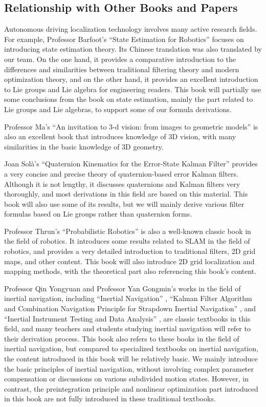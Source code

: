 \subsection*{Relationship with Other Books and Papers}
Autonomous driving localization technology involves many active research fields. For example, Professor Barfoot's ``State Estimation for Robotics'' \cite{Barfoot2016} focuses on introducing state estimation theory. Its Chinese translation was also translated by our team. On the one hand, it provides a comparative introduction to the differences and similarities between traditional filtering theory and modern optimization theory, and on the other hand, it provides an excellent introduction to Lie groups and Lie algebra for engineering readers. This book will partially use some conclusions from the book on state estimation, mainly the part related to Lie groups and Lie algebras, to support some of our formula derivations.

Professor Ma's ``An invitation to 3-d vision: from images to geometric models'' \cite{Ma2012a} is also an excellent book that introduces knowledge of 3D vision, with many similarities in the basic knowledge of 3D geometry.

Joan Sol{\`{a}}'s ``Quaternion Kinematics for the Error-State Kalman Filter'' \cite{Sola2017} provides a very concise and precise theory of quaternion-based error Kalman filters. Although it is not lengthy, it discusses quaternions and Kalman filters very thoroughly, and most derivations in this field are based on this material. This book will also use some of its results, but we will mainly derive various filter formulas based on Lie groups rather than quaternion forms.

Professor Thrun's ``Probabilistic Robotics'' \cite{Thrun2005} is also a well-known classic book in the field of robotics. It introduces some results related to SLAM in the field of robotics, and provides a very detailed introduction to traditional filters, 2D grid maps, and other content. This book will also introduce 2D grid localization and mapping methods, with the theoretical part also referencing this book's content.

Professor Qin Yongyuan and Professor Yan Gongmin's works in the field of inertial navigation, including ``Inertial Navigation'' \cite{Qin2014}, ``Kalman Filter Algorithm and Combination Navigation Principle for Strapdown Inertial Navigation'' \cite{Yan2019}, and ``Inertial Instrument Testing and Data Analysis'' \cite{Yan2012}, are classic textbooks in this field, and many teachers and students studying inertial navigation will refer to their derivation process. This book also refers to these books in the field of inertial navigation, but compared to specialized textbooks on inertial navigation, the content introduced in this book will be relatively basic. We mainly introduce the basic principles of inertial navigation, without involving complex parameter compensation or discussions on various subdivided motion states. However, in contrast, the preintegration principle and nonlinear optimization part introduced in this book are not fully introduced in these traditional textbooks.

